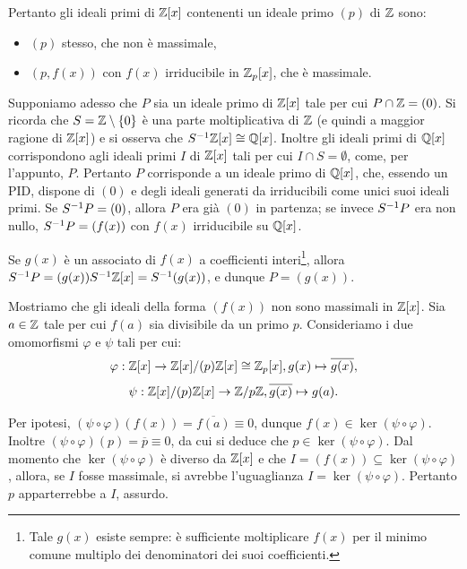\documentclass[11pt]{scrartcl}
\begin{document}
	Pertanto gli ideali primi di $\mathbb Z[x]$ contenenti un ideale primo $(p)$ di $\mathbb Z$
	sono:
	\begin{itemize}
		\item $(p)$ stesso, che non è massimale,
		\item $(p, f(x))$ con $f(x)$ irriducibile in $\mathbb Z_p[x]$, che è massimale.
	\end{itemize}
	
	Supponiamo adesso che $P$ sia un ideale primo di $\mathbb Z[x]$ tale per cui 
	$P \cap \mathbb Z = (0)$. Si ricorda che $S = \mathbb Z\setminus \{0\}$ è una parte moltiplicativa di 
	$\mathbb Z$ (e quindi a maggior ragione di $\mathbb Z[x]$) e si osserva che $S^{-1} \mathbb Z[x] \cong \mathbb Q[x]$. Inoltre gli ideali primi di $\mathbb Q[x]$ corrispondono agli ideali primi $I$
	di $\mathbb Z[x]$ tali per cui $I \cap S = \emptyset$, come, per l'appunto,
	$P$. Pertanto $P$ corrisponde a un ideale primo di $\mathbb Q[x]$, che, essendo un PID,
	dispone di $(0)$ e degli ideali generati da irriducibili come unici suoi
	ideali primi. Se $S^{-1} P = (0)$, allora $P$ era già $(0)$ in partenza; se
	invece $S^{-1} P$ era non nullo, $S^{-1} P = (f(x))$ con $f(x)$ irriducibile
	su $\mathbb Q[x]$. \medskip
	
	Se $g(x)$ è un associato di $f(x)$ a coefficienti interi\footnote{
		Tale $g(x)$ esiste sempre: è sufficiente moltiplicare $f(x)$ per il minimo
		comune multiplo dei denominatori dei suoi coefficienti.
	}, allora $S^{-1} P = (g(x)) S^{-1} \mathbb Z[x] = S^{-1} (g(x))$, e dunque $P = (g(x))$. 
	
	
	\begin{remark}
		Mostriamo che gli ideali della forma $(f(x))$ non sono massimali in
		$\mathbb Z[x]$. Sia $a \in \mathbb Z$ tale per cui $f(a)$ sia divisibile da un
		primo $p$. Consideriamo i due omomorfismi $\varphi$ e $\psi$ tali
		per cui:
		\[ \varphi : \mathbb Z[x] \to \mathbb Z[x]/(p)\mathbb Z[x] \cong \mathbb Z_p[x], g(x) \mapsto \overline{g(x)}, \]
		\[ \psi : \mathbb Z[x]/(p)\mathbb Z[x] \to \mathbb Z/p\mathbb Z, \overline{g(x)} \mapsto g(a). \]
		
		Per ipotesi, $(\psi \circ \varphi)(f(x)) = \overline{f(a)} \equiv 0$, 
		dunque $f(x) \in \ker (\psi \circ \varphi)$. Inoltre $(\psi \circ \varphi)(p)
		= \overline{p} \equiv 0$, da cui si deduce che $p \in \ker (\psi \circ \varphi)$.
		Dal momento che $\ker (\psi \circ \varphi)$ è diverso da $\mathbb Z[x]$ e che
		$I = (f(x)) \subseteq \ker (\psi \circ \varphi)$, allora, se $I$ fosse
		massimale, si avrebbe l'uguaglianza $I = \ker (\psi \circ \varphi)$. Pertanto
		$p$ apparterrebbe a $I$, assurdo.
	\end{remark}
	
\end{document}
